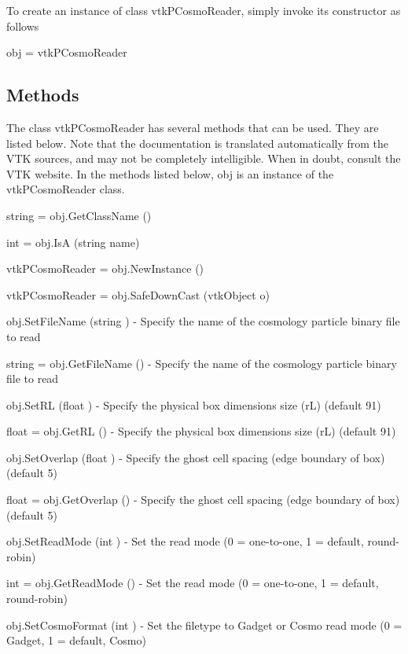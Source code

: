 To create an instance of class vtk\-P\-Cosmo\-Reader, simply invoke its constructor as follows \begin{DoxyVerb}  obj = vtkPCosmoReader
\end{DoxyVerb}
 \hypertarget{vtkwidgets_vtkxyplotwidget_Methods}{}\subsection{Methods}\label{vtkwidgets_vtkxyplotwidget_Methods}
The class vtk\-P\-Cosmo\-Reader has several methods that can be used. They are listed below. Note that the documentation is translated automatically from the V\-T\-K sources, and may not be completely intelligible. When in doubt, consult the V\-T\-K website. In the methods listed below, {\ttfamily obj} is an instance of the vtk\-P\-Cosmo\-Reader class. 
\begin{DoxyItemize}
\item {\ttfamily string = obj.\-Get\-Class\-Name ()}  
\item {\ttfamily int = obj.\-Is\-A (string name)}  
\item {\ttfamily vtk\-P\-Cosmo\-Reader = obj.\-New\-Instance ()}  
\item {\ttfamily vtk\-P\-Cosmo\-Reader = obj.\-Safe\-Down\-Cast (vtk\-Object o)}  
\item {\ttfamily obj.\-Set\-File\-Name (string )} -\/ Specify the name of the cosmology particle binary file to read  
\item {\ttfamily string = obj.\-Get\-File\-Name ()} -\/ Specify the name of the cosmology particle binary file to read  
\item {\ttfamily obj.\-Set\-R\-L (float )} -\/ Specify the physical box dimensions size (r\-L) (default 91)  
\item {\ttfamily float = obj.\-Get\-R\-L ()} -\/ Specify the physical box dimensions size (r\-L) (default 91)  
\item {\ttfamily obj.\-Set\-Overlap (float )} -\/ Specify the ghost cell spacing (edge boundary of box) (default 5)  
\item {\ttfamily float = obj.\-Get\-Overlap ()} -\/ Specify the ghost cell spacing (edge boundary of box) (default 5)  
\item {\ttfamily obj.\-Set\-Read\-Mode (int )} -\/ Set the read mode (0 = one-\/to-\/one, 1 = default, round-\/robin)  
\item {\ttfamily int = obj.\-Get\-Read\-Mode ()} -\/ Set the read mode (0 = one-\/to-\/one, 1 = default, round-\/robin)  
\item {\ttfamily obj.\-Set\-Cosmo\-Format (int )} -\/ Set the filetype to Gadget or Cosmo read mode (0 = Gadget, 1 = default, Cosmo)  

\end{DoxyItemize}
